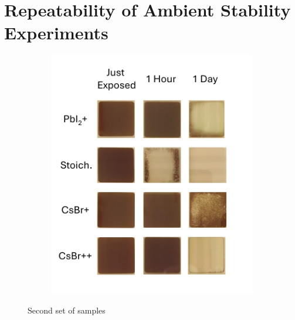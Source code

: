 \chapter{Repeatability of Ambient Stability Experiments}\label{ch:appendixB}

\begin{figure}[htbp]
    \centering
    \begin{subfigure}[t]{0.5\textwidth}
        \centering
        \includegraphics[width=\textwidth]{chapters/appendixB/images/Stability_Rotation_Stoichiometries_v2.pdf} %
             
    \end{subfigure}

    \caption{Second set of samples}
    \label{fig:appendix:stoichiometry_rotation_V2}
\end{figure}


